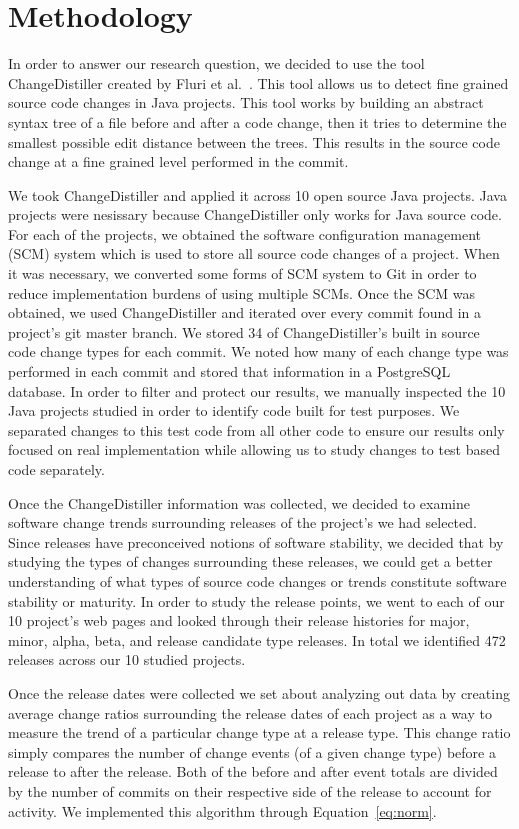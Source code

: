 \documentclass[conference]{IEEEtran}
\begin{document}
\section{Methodology}
\label{sec:meth}
In order to answer our research question, we decided to use the tool ChangeDistiller created by Fluri et al.~\cite{Fluri:2007:CDT}. This tool allows us to detect fine grained
source code changes in Java projects. This tool works by building an abstract syntax tree of a file before and after a code change, then it tries to determine
the smallest possible edit distance between the trees. This results in the source code change at a fine grained level performed in the commit.

We took ChangeDistiller and applied it across 10 open source Java projects. Java projects were nesissary because ChangeDistiller only works for Java source code.
For each of the projects, we obtained the software configuration management (SCM) system
which is used to store all source code changes of a project. When it was necessary, we converted some forms of SCM system to Git in order to reduce implementation
burdens of using multiple SCMs. Once the SCM was obtained, we used ChangeDistiller and iterated over every commit found in a project's git master branch. We stored
34 of ChangeDistiller's built in source code change types for each commit. We noted how many of each change type was performed in each commit and stored that information
in a PostgreSQL database. In order to filter and protect our results, we manually inspected the 10 Java projects studied in order to identify code built for test
purposes.
We separated changes to this test code from all other code to ensure our results only focused on real implementation while allowing us to study changes to
test based code separately.

Once the ChangeDistiller information was collected, we decided to examine software change trends surrounding releases of the project's we had selected. Since releases
have preconceived notions of software stability, we decided that by studying the types of changes surrounding these releases, we could get a better understanding of
what types of source code changes or trends constitute software stability or maturity. In order to study the release points, we went to each of our 10 project's 
web pages and looked through their release histories for major, minor, alpha, beta, and release candidate type releases. In total we identified 472 releases
across our 10 studied projects.  

Once the release dates were collected we set about analyzing out data by creating average change ratios surrounding the release dates of each 
project as a way to measure the trend of a particular change type at a release type. This change ratio simply compares the number of change events (of a given
change type) before a release to after the release. Both of the before and after event totals are divided by the number of commits on their respective side
of the release to account for activity. We implemented this algorithm through Equation~\ref{eq:norm}.
\end{document}

